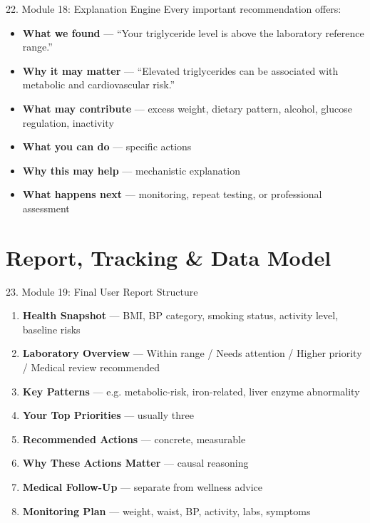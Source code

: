 \documentclass[10pt,aspectratio=169]{beamer}
\begin{document}
\begin{frame}{22. Module 18: Explanation Engine}
Every important recommendation offers:
\scriptsize
\begin{itemize}
\item \textbf{What we found} --- ``Your triglyceride level is above the laboratory reference range.''
\item \textbf{Why it may matter} --- ``Elevated triglycerides can be associated with metabolic and cardiovascular risk.''
\item \textbf{What may contribute} --- excess weight, dietary pattern, alcohol, glucose regulation, inactivity
\item \textbf{What you can do} --- specific actions
\item \textbf{Why this may help} --- mechanistic explanation
\item \textbf{What happens next} --- monitoring, repeat testing, or professional assessment
\end{itemize}
\end{frame}

\section{Report, Tracking \& Data Model}

\begin{frame}{23. Module 19: Final User Report Structure}
\scriptsize
\begin{enumerate}
\item \textbf{Health Snapshot} --- BMI, BP category, smoking status, activity level, baseline risks
\item \textbf{Laboratory Overview} --- Within range / Needs attention / Higher priority / Medical review recommended
\item \textbf{Key Patterns} --- e.g. metabolic-risk, iron-related, liver enzyme abnormality
\item \textbf{Your Top Priorities} --- usually three
\item \textbf{Recommended Actions} --- concrete, measurable
\item \textbf{Why These Actions Matter} --- causal reasoning
\item \textbf{Medical Follow-Up} --- separate from wellness advice
\item \textbf{Monitoring Plan} --- weight, waist, BP, activity, labs, symptoms
\end{enumerate}
\end{frame}
\end{document}
